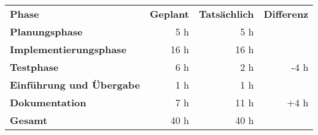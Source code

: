 \begin{tabular}{lrrr}
\rowcolor{heading}\textbf{Phase} & \textbf{Geplant} & \textbf{Tatsächlich} & \textbf{Differenz} \\
\textbf{Planungsphase} & 5 h  & 5 h  &  \\
\rowcolor{odd}\textbf{Implementierungsphase} & 16 h   & 16 h  & \\
\textbf{Testphase} & 6 h  & 2 h  & -4 h \\
\rowcolor{odd}\textbf{Einführung und Übergabe} & 1 h   & 1 h   &  \\
\textbf{Dokumentation} & 7 h   & 11 h   & +4 h \\
\hline
\hline
\rowcolor{odd}\textbf{Gesamt} & 40 h  & 40 h  &  \\
\end{tabular}
